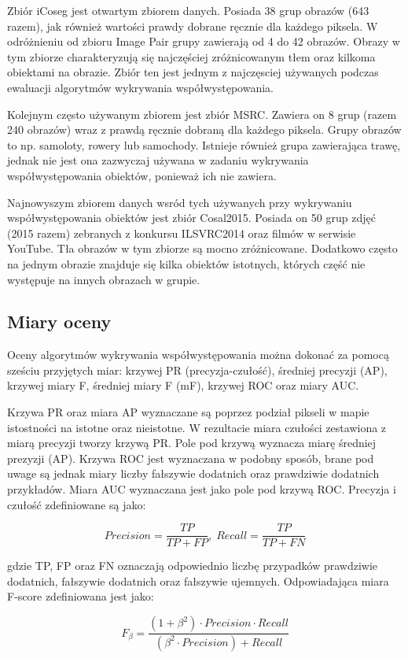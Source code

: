 \documentclass[a4paper,11pt, notitlepage, twosides, openany ]{report}
\begin{document}
	Zbiór iCoseg jest otwartym zbiorem danych. Posiada 38 grup obrazów (643 razem), jak również wartości prawdy dobrane ręcznie dla każdego piksela. W odróżnieniu od zbioru Image Pair grupy zawierają od 4 do 42 obrazów. Obrazy w tym zbiorze charakteryzują się najczęściej zróżnicowanym tłem oraz kilkoma obiektami na obrazie. Zbiór ten jest jednym z najczęsciej używanych podczas ewaluacji algorytmów wykrywania współwystępowania.

	Kolejnym często używanym zbiorem jest zbiór MSRC. Zawiera on 8 grup (razem 240 obrazów) wraz z prawdą ręcznie dobraną dla każdego piksela. Grupy obrazów to np. samoloty, rowery lub samochody. Istnieje również grupa zawierająca trawę, jednak nie jest ona zazwyczaj używana w zadaniu wykrywania współwystępowania obiektów, ponieważ ich nie zawiera.

	Najnowyszym zbiorem danych wsród tych używanych przy wykrywaniu współwystępowania obiektów jest zbiór Cosal2015. Posiada on 50 grup zdjęć (2015 razem) zebranych z konkursu ILSVRC2014 oraz filmów w serwisie YouTube. Tła obrazów w tym zbiorze są mocno zróżnicowane. Dodatkowo często na jednym obrazie znajduje się kilka obiektów istotnych, których część nie występuje na innych obrazach w grupie.

	\subsection{Miary oceny}
	Oceny algorytmów wykrywania współwystępowania można dokonać za pomocą sześciu przyjętych miar: krzywej PR (precyzja-czułość), średniej precyzji (AP), krzywej miary F, średniej miary F (mF), krzywej ROC oraz miary AUC. 

	Krzywa PR oraz miara AP wyznaczane są poprzez podział pikseli w mapie istostności na istotne oraz nieistotne. W rezultacie miara czułości zestawiona z miarą precyzji tworzy krzywą PR. Pole pod krzywą wyznacza miarę średniej prezyzji (AP). Krzywa ROC jest wyznaczana w podobny sposób, brane pod uwage są jednak miary liczby fałszywie dodatnich oraz prawdziwie dodatnich przykładów. Miara AUC wyznaczana jest jako pole pod krzywą ROC. Precyzja i czułość zdefiniowane są jako:

	$$
		Precision = \frac{TP}{TP + FP}, \; Recall = \frac{TP}{TP + FN}
	$$

	gdzie TP, FP oraz FN oznaczają odpowiednio liczbę przypadków prawdziwie dodatnich, fałszywie dodatnich oraz fałszywie ujemnych. Odpowiadająca miara F-score zdefiniowana jest jako:

	$$
		F_{\beta} = \frac{(1 + \beta^2)\cdot Precision \cdot Recall}{(\beta^2 \cdot Precision) + Recall}
	$$
\end{document}
